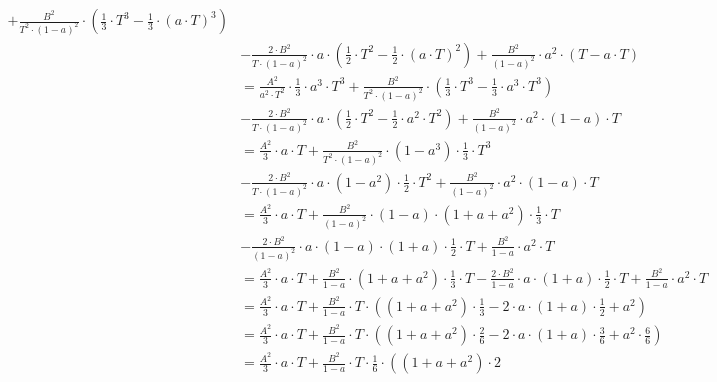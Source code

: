 \begin{align*}
 +\frac{B^2}{T^2 \cdot \left(1 - a \right)^2}\cdot \left( \frac{1}{3} \cdot T^3 -\frac{1}{3} \cdot \left( a\cdot T \right)^3 \right) \\
 &- \frac{2\cdot B^2}{T\cdot \left(1 - a\right)^2}\cdot a \cdot \left( \frac{1}{2} \cdot T^2 -  \frac{1}{2} \cdot \left(a \cdot T\right)^2 \right)
 + \frac{B^2}{\left(1 - a \right)^2} \cdot a^2 \cdot \left( T - a \cdot T \right)\\
 &=\frac{A^2}{a^2 \cdot T^2}\cdot \frac{1}{3}\cdot a^3 \cdot T^3
 +\frac{B^2}{T^2 \cdot \left(1 - a \right)^2}\cdot \left( \frac{1}{3} \cdot T^3 -\frac{1}{3} \cdot a^3 \cdot T ^3 \right) \\
 &- \frac{2\cdot B^2}{T\cdot \left(1 - a\right)^2}\cdot a \cdot \left( \frac{1}{2} \cdot T^2 -  \frac{1}{2} \cdot a^2 \cdot T^2 \right)
 + \frac{B^2}{\left(1 - a \right)^2} \cdot a^2 \cdot \left( 1 - a\right) \cdot T\\
 &=\frac{A^2}{3}\cdot a \cdot T
 +\frac{B^2}{T^2 \cdot \left(1 - a \right)^2}\cdot \left(1 -a^3 \right)\cdot \frac{1}{3} \cdot T^3 \\
 &- \frac{2\cdot B^2}{T\cdot \left(1 - a\right)^2}\cdot a \cdot \left( 1 -   a^2 \right) \cdot \frac{1}{2} \cdot T^2
 + \frac{B^2}{\left(1 - a \right)^2} \cdot a^2 \cdot \left( 1 - a\right) \cdot T\\ 
 &=\frac{A^2}{3}\cdot a \cdot T
 +\frac{B^2}{\left(1 - a\right)^2}\cdot \left(1-a\right)\cdot \left(1 +a + a^2 \right)\cdot \frac{1}{3} \cdot T \\
 &- \frac{2\cdot B^2}{\left(1 - a\right)^2}\cdot a \cdot \left( 1 - a \right) \cdot \left( 1 + a \right) \cdot \frac{1}{2} \cdot T
 + \frac{B^2}{1 - a} \cdot a^2 \cdot T\\
 &=\frac{A^2}{3}\cdot a \cdot T
 +\frac{B^2}{1 - a}\cdot \left(1 +a + a^2 \right)\cdot \frac{1}{3} \cdot T
 - \frac{2\cdot B^2}{1 - a}\cdot a \cdot \left( 1 + a \right) \cdot \frac{1}{2} \cdot T
 + \frac{B^2}{1 - a} \cdot a^2 \cdot T\\
 &=\frac{A^2}{3}\cdot a \cdot T
 +\frac{B^2}{1 - a}\cdot T \cdot \left( \left(1 +a + a^2 \right)\cdot \frac{1}{3}
 - 2 \cdot a \cdot \left( 1 + a \right) \cdot \frac{1}{2}
 + a^2 \right)\\
 &=\frac{A^2}{3}\cdot a \cdot T
 +\frac{B^2}{1 - a}\cdot T \cdot \left( \left(1 +a + a^2 \right)\cdot \frac{2}{6}
 - 2 \cdot a \cdot \left( 1 + a \right) \cdot \frac{3}{6}
 + a^2 \cdot \frac{6}{6} \right)\\ 
 &=\frac{A^2}{3}\cdot a \cdot T
 +\frac{B^2}{1 - a}\cdot T \cdot \frac{1}{6} \cdot \left( \left(1 +a + a^2 \right)\cdot 2

\end{align*}
